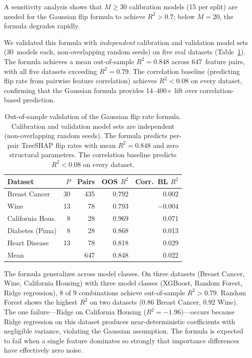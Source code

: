 \documentclass[11pt,a4paper]{article}
\begin{document}
A sensitivity analysis shows that $M \geq 30$ calibration models (15 per split) are needed for the Gaussian flip formula to achieve $R^2 > 0.7$; below $M = 20$, the formula degrades rapidly.

We validated this formula with \emph{independent} calibration and validation
model sets (30~models each, non-overlapping random seeds) on five real
datasets (Table~\ref{tab:gaussian-flip}).  The formula achieves a mean
out-of-sample $R^2 = 0.848$ across 647~feature pairs, with all five datasets
exceeding $R^2 = 0.79$.  The correlation baseline (predicting flip rate from
pairwise feature correlation) achieves $R^2 < 0.08$ on every dataset,
confirming that the Gaussian formula provides 14--400$\times$ lift over
correlation-based prediction.

\begin{table}[t]
  \centering
  \small
  \begin{tabular}{@{}lrrrr@{}}
    \toprule
    Dataset & $P$ & Pairs & OOS $R^2$ & Corr.\ BL $R^2$ \\
    \midrule
    Breast Cancer    & 30 & 435 & 0.792 & 0.002 \\
    Wine             & 13 &  78 & 0.793 & $-0.004$ \\
    California Hous. &  8 &  28 & 0.969 & 0.071 \\
    Diabetes (Pima)  &  8 &  28 & 0.868 & 0.013 \\
    Heart Disease    & 13 &  78 & 0.818 & 0.029 \\
    \midrule
    Mean             &    & 647 & 0.848 & 0.022 \\
    \bottomrule
  \end{tabular}
  \caption{Out-of-sample validation of the Gaussian flip rate formula.
    Calibration and validation model sets are independent (non-overlapping
    random seeds).  The formula predicts per-pair TreeSHAP flip rates with
    mean $R^2 = 0.848$ and zero structural parameters.  The correlation
    baseline predicts $R^2 < 0.08$ on every dataset.}
  \label{tab:gaussian-flip}
\end{table}

The formula generalizes across model classes.  On three datasets (Breast Cancer, Wine, California Housing) with three model classes (XGBoost, Random Forest, Ridge regression), 8 of 9 combinations achieve out-of-sample $R^2 > 0.79$.  Random Forest shows the highest $R^2$ on two datasets (0.86 Breast Cancer, 0.92 Wine).  The one failure---Ridge on California Housing ($R^2 = -1.96$)---occurs because Ridge regression on this dataset produces near-deterministic coefficients with negligible variance, violating the Gaussian assumption.  The formula is expected to fail when a single feature dominates so strongly that importance differences have effectively zero noise.
\end{document}
